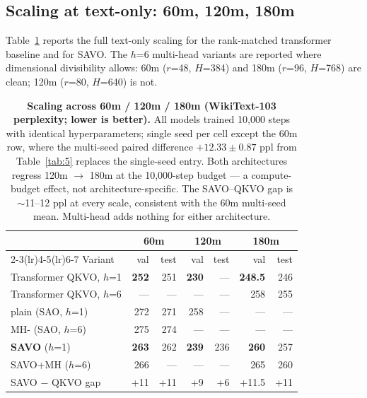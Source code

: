 \subsection{Scaling at text-only: 60m, 120m, 180m}\label{sec:5.6}

Table~\ref{tab:7} reports the full text-only scaling for the rank-matched transformer baseline and for SAVO. The
$h$=6 multi-head variants are reported where dimensional divisibility allows: 60m ($r$=48, $H$=384) and
180m ($r$=96, $H$=768) are clean; 120m ($r$=80, $H$=640) is not.

\begin{table}[H]
\centering
\small
\renewcommand{\arraystretch}{1.2}
\begin{tabular}{lrrrrrr}
\toprule
 & \multicolumn{2}{c}{60m} & \multicolumn{2}{c}{120m} & \multicolumn{2}{c}{180m} \\
\cmidrule(lr){2-3}\cmidrule(lr){4-5}\cmidrule(lr){6-7}
Variant & val & test & val & test & val & test \\
\midrule
Transformer QKVO, $h$=1 & \textbf{252} & 251 & \textbf{230} & --- & \textbf{248.5} & 246 \\
Transformer QKVO, $h$=6 & --- & --- & --- & --- & 258 & 255 \\
\midrule
\QC{} plain (SAO, $h$=1) & 272 & 271 & 258 & --- & --- & --- \\
MH-\QC{} (SAO, $h$=6) & 275 & 274 & --- & --- & --- & --- \\
\textbf{SAVO} ($h$=1) & \textbf{263} & 262 & \textbf{239} & 236 & \textbf{260} & 257 \\
SAVO+MH ($h$=6) & 266 & --- & --- & --- & 265 & 260 \\
\midrule
SAVO $-$ QKVO gap & +11 & +11 & +9 & +6 & +11.5 & +11 \\
\bottomrule
\end{tabular}
\caption{\textbf{Scaling across 60m / 120m / 180m (WikiText-103 perplexity; lower is better).} All models trained
10,000 steps with identical hyperparameters; single seed per cell except the 60m row, where the multi-seed paired
difference $+12.33\pm0.87$ ppl from Table~\ref{tab:5} replaces the single-seed entry. Both architectures regress 120m $\rightarrow$ 180m
at the 10,000-step budget --- a compute-budget effect, not architecture-specific. The SAVO--QKVO gap is $\sim$11--12
ppl at every scale, consistent with the 60m multi-seed mean. Multi-head adds nothing for either architecture.}
\label{tab:7}
\end{table}

